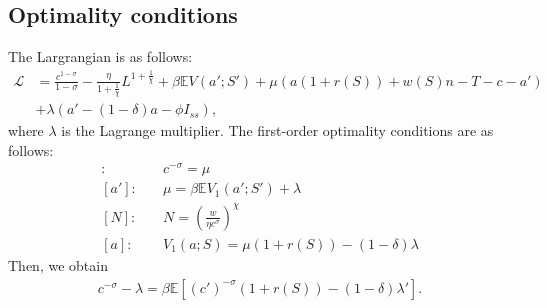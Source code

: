 \subsection*{Optimality conditions}
The Largrangian is as follows:
\begin{align*}
  \mathcal{L} 
  &= \frac{c^{1-\sigma}}{1-\sigma} - \frac{\eta}{1+\frac{1}{\chi}} L^{1+\frac{1}{\chi}} + \beta \mathbb{E}V(a';S') + \mu(a(1+r(S)) + w(S)n - T - c-a' )
  \\ 
  &+ \lambda(a' - (1-\delta)a - \phi I_{ss}),
\end{align*}
where $\lambda$ is the Lagrange multiplier.
The first-order optimality conditions are as follows:
\begin{align*}
  [c]:&\quad c^{-\sigma} = \mu
  \\
  [a']:&\quad \mu = \beta \mathbb{E}V_{1}(a';S') + \lambda
  \\
  [N]:&\quad N = \left(\frac{w}{\eta c^{\sigma}}\right)^{\chi}
  \\
  [a]:&\quad V_{1}(a;S) = \mu(1+r(S)) - (1-\delta)\lambda
\end{align*}
Then, we obtain
\begin{align*}
  c^{-\sigma} -\lambda= \beta \mathbb{E}\left[(c')^{-\sigma}(1+r(S)) -(1-\delta)\lambda'\right].
\end{align*}